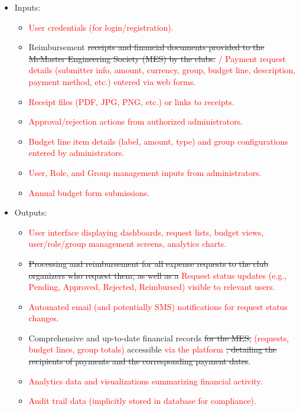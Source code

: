 \documentclass{article}
\begin{document}
\begin{itemize}
    \item Inputs:
        \begin{itemize}
            \item \textcolor{red}{User credentials (for login/registration).}
            \item Reimbursement \sout{receipts and financial documents provided to the McMaster Engineering Society (MES) by the clubs.} \textcolor{red}{/ Payment request details (submitter info, amount, currency, group, budget line, description, payment method, etc.) entered via web forms.}
            \item \textcolor{red}{Receipt files (PDF, JPG, PNG, etc.) or links to receipts.}
            \item \textcolor{red}{Approval/rejection actions from authorized administrators.}
            \item \textcolor{red}{Budget line item details (label, amount, type) and group configurations entered by administrators.}
            \item \textcolor{red}{User, Role, and Group management inputs from administrators.}
            \item \textcolor{red}{Annual budget form submissions.}
        \end{itemize}
    \item Outputs:
        \begin{itemize}
            \item \textcolor{red}{User interface displaying dashboards, request lists, budget views, user/role/group management screens, analytics charts.}
            \item \sout{Processing and reimbursement for all expense requests to the club organizers who request them, as well as a} \textcolor{red}{Request status updates (e.g., Pending, Approved, Rejected, Reimbursed) visible to relevant users.}
            \item \textcolor{red}{Automated email (and potentially SMS) notifications for request status changes.}
            \item Comprehensive and up-to-date financial records \sout{for the MES,} \textcolor{red}{(requests, budget lines, group totals)} accessible \textcolor{red}{via the platform} \sout{, detailing the recipients of payments and the corresponding payment dates}.
            \item \textcolor{red}{Analytics data and visualizations summarizing financial activity.}
            \item \textcolor{red}{Audit trail data (implicitly stored in database for compliance).}
        \end{itemize}
\end{itemize}
\end{document}
